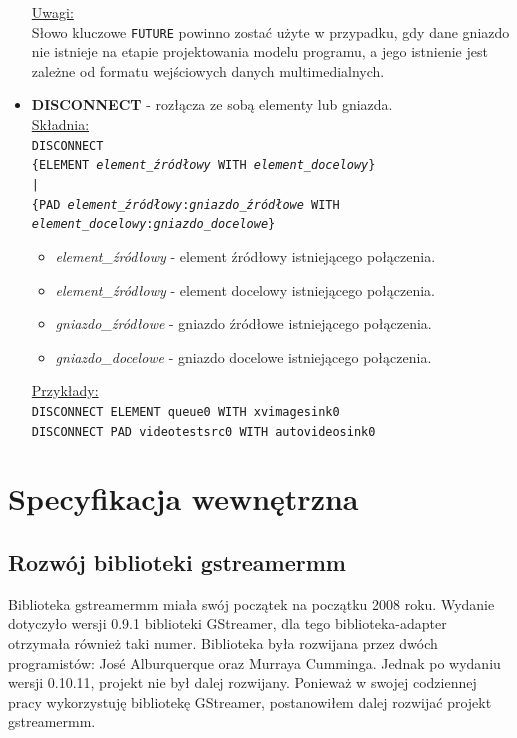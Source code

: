 \documentclass[12pt]{article}
\begin{document}
\begin{itemize}
\underline{Uwagi:} \\
Słowo kluczowe \texttt{FUTURE} powinno zostać użyte w przypadku, gdy dane gniazdo nie istnieje na etapie projektowania modelu programu, a jego istnienie jest zależne od formatu wejściowych danych multimedialnych.
\cleardoublepage
\item \textbf{DISCONNECT} - rozłącza ze sobą elementy lub gniazda. \\
\underline{Składnia:} \\
\texttt{DISCONNECT \\
\hspace*{2em} \{ELEMENT \textit{element\_źródłowy} WITH \textit{element\_docelowy}\} \\
\hspace*{2em} | \\
\hspace*{2em} \{PAD \textit{element\_źródłowy}:\textit{gniazdo\_źródłowe} WITH \\
\hspace*{4em} \textit{element\_docelowy}:\textit{gniazdo\_docelowe}\}
}
\begin{itemize}
\item \textit{element\_źródłowy} - element źródłowy istniejącego połączenia.
\item \textit{element\_źródłowy} - element docelowy istniejącego połączenia.
\item \textit{gniazdo\_źródłowe} - gniazdo źródłowe istniejącego połączenia.
\item \textit{gniazdo\_docelowe} - gniazdo docelowe istniejącego połączenia.
\end{itemize}
\underline{Przykłady:} \\
\texttt{DISCONNECT ELEMENT queue0 WITH xvimagesink0} \\
\texttt{DISCONNECT PAD videotestsrc0 WITH autovideosink0}
\end{itemize}
\cleardoublepage
\section{Specyfikacja wewnętrzna}
\subsection{Rozwój biblioteki gstreamermm}
Biblioteka gstreamermm miała swój początek na początku 2008 roku. Wydanie dotyczyło wersji 0.9.1 biblioteki GStreamer, dla tego biblioteka-adapter otrzymała również taki numer. Biblioteka była rozwijana przez dwóch programistów: José Alburquerque oraz Murraya Cumminga. Jednak po wydaniu wersji 0.10.11, projekt nie był dalej rozwijany. Ponieważ w swojej codziennej pracy wykorzystuję bibliotekę GStreamer, postanowiłem dalej rozwijać projekt gstreamermm.
\end{document}
